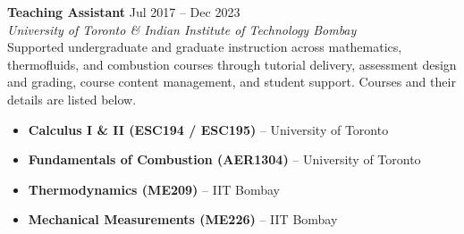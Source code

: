 \documentclass[11pt,a4paper]{article}
\begin{document}
	\raggedright
	\vspace*{6pt}
	\noindent\textbf{Teaching Assistant} \hfill Jul 2017 -- Dec 2023 \\
	\emph{University of Toronto \& Indian Institute of Technology Bombay}\\
	Supported undergraduate and graduate instruction across mathematics, thermofluids, and combustion courses through tutorial delivery, assessment design and grading, course content management, and student support. Courses and their details are listed below.\vspace*{6pt}
	\begin{itemize}
		\item \textbf{Calculus I \& II (ESC194 / ESC195)} – University of Toronto
		\item \textbf{Fundamentals of Combustion (AER1304)} – University of Toronto
		\item \textbf{Thermodynamics (ME209)} – IIT Bombay
		\item \textbf{Mechanical Measurements (ME226)} – IIT Bombay
	\end{itemize}
	
\end{document}
